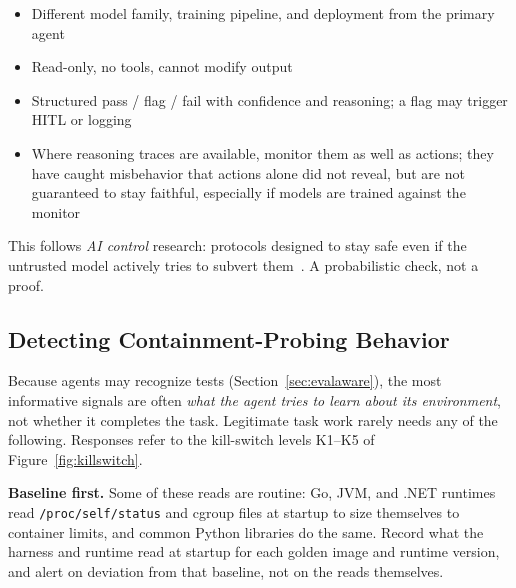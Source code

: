 \documentclass[11pt,letterpaper]{article}
\begin{document}
\begin{securitybox}
\begin{itemize}
  \item Different model family, training pipeline, and deployment from the primary agent
  \item Read-only, no tools, cannot modify output
  \item Structured pass / flag / fail with confidence and reasoning; a flag may trigger HITL or logging
  \item Where reasoning traces are available, monitor them as well as actions; they have caught misbehavior that actions alone did not reveal, but are not guaranteed to stay faithful, especially if models are trained against the monitor
\end{itemize}
This follows \emph{AI control} research: protocols designed to stay safe even if the untrusted model actively tries to subvert them~\cite{aicontrol}. A probabilistic check, not a proof.
\end{securitybox}

\subsection{Detecting Containment-Probing Behavior}
\label{sec:probing}

Because agents may recognize tests (Section~\ref{sec:evalaware}), the most informative signals are often \emph{what the agent tries to learn about its environment}, not whether it completes the task. Legitimate task work rarely needs any of the following. Responses refer to the kill-switch levels K1--K5 of Figure~\ref{fig:killswitch}.

\textbf{Baseline first.} Some of these reads are routine: Go, JVM, and .NET runtimes read \texttt{/proc/self/status} and cgroup files at startup to size themselves to container limits, and common Python libraries do the same. Record what the harness and runtime read at startup for each golden image and runtime version, and alert on deviation from that baseline, not on the reads themselves.
\end{document}

